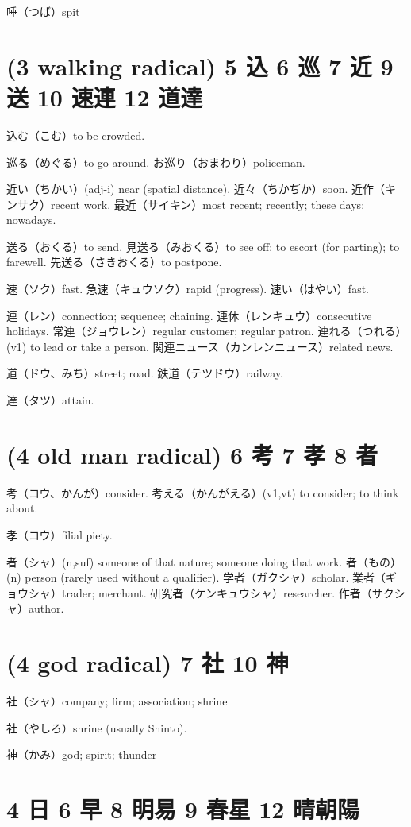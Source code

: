 唾（つば）spit

\section{(3 walking radical) 5 込 6 巡 7 近 9 送 10 速連 12 道達}

込む（こむ）to be crowded.

巡る（めぐる）to go around.
お巡り（おまわり）policeman.

近い（ちかい）(adj-i) near (spatial distance).
近々（ちかぢか）soon.
近作（キンサク）recent work.
最近（サイキン）most recent; recently; these days; nowadays.

送る（おくる）to send.
見送る（みおくる）to see off; to escort (for parting); to farewell.
先送る（さきおくる）to postpone.

速（ソク）fast.
急速（キュウソク）rapid (progress).
速い（はやい）fast.

連（レン）connection; sequence; chaining.
連休（レンキュウ）consecutive holidays.
常連（ジョウレン）regular customer; regular patron.
連れる（つれる）(v1) to lead or take a person.
関連ニュース（カンレンニュース）related news.

道（ドウ、みち）street; road.
鉄道（テツドウ）railway.

達（タツ）attain.

\section{(4 old man radical) 6 考 7 孝 8 者}

考（コウ、かんが）consider.
考える（かんがえる）(v1,vt) to consider; to think about.

孝（コウ）filial piety.

者（シャ）(n,suf) someone of that nature; someone doing that work.
者（もの）(n) person (rarely used without a qualifier).
学者（ガクシャ）scholar.
業者（ギョウシャ）trader; merchant.
研究者（ケンキュウシャ）researcher.
作者（サクシャ）author.

\section{(4 god radical) 7 社 10 神}

社（シャ）company; firm; association; shrine

社（やしろ）shrine (usually Shinto).

神（かみ）god; spirit; thunder

\section{4 日 6 早 8 明易 9 春星 12 晴朝陽}

